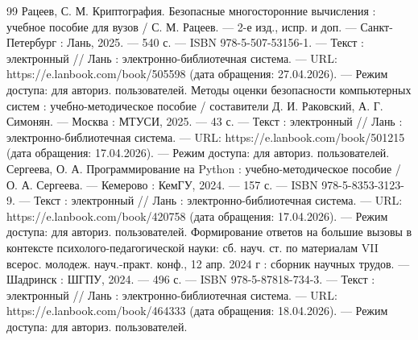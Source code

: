 \documentclass[14pt, a4paper]{extarticle}
\newcommand{\currentappendixletter}{А}
\newcommand{\setappendixletter}[1]{
  \renewcommand{\currentappendixletter}{#1}
}
\begin{document}
\begin{thebibliography}{99}
	Рацеев, С. М. Криптография. Безопасные многосторонние вычисления : учебное пособие для вузов / С. М. Рацеев. — 2-е изд., испр. и доп. — Санкт-Петербург : Лань, 2025. — 540 с. — ISBN 978-5-507-53156-1. — Текст : электронный // Лань : электронно-библиотечная система. — URL: https://e.lanbook.com/book/505598 (дата обращения: 27.04.2026). — Режим доступа: для авториз. пользователей.
	Методы оценки безопасности компьютерных систем : учебно-методическое пособие / составители Д. И. Раковский, А. Г. Симонян. — Москва : МТУСИ, 2025. — 43 с. — Текст : электронный // Лань : электронно-библиотечная система. — URL: https://e.lanbook.com/book/501215 (дата обращения: 17.04.2026). — Режим доступа: для авториз. пользователей.
	Сергеева, О. А. Программирование на Python : учебно-методическое пособие / О. А. Сергеева. — Кемерово : КемГУ, 2024. — 157 с. — ISBN 978-5-8353-3123-9. — Текст : электронный // Лань : электронно-библиотечная система. — URL: https://e.lanbook.com/book/420758 (дата обращения: 17.04.2026). — Режим доступа: для авториз. пользователей.
	Формирование ответов на большие вызовы в контексте психолого-педагогической науки: сб. науч. ст. по материалам VII всерос. молодеж. науч.-практ. конф., 12 апр. 2024 г : сборник научных трудов. — Шадринск : ШГПУ, 2024. — 496 с. — ISBN 978-5-87818-734-3. — Текст : электронный // Лань : электронно-библиотечная система. — URL: https://e.lanbook.com/book/464333 (дата обращения: 18.04.2026). — Режим доступа: для авториз. пользователей.
	\end{thebibliography}
		
	\label{bib:end}

	\afterpage{\setlength{\footskip}{3cm}}
	\afterpage{\setlength{\skip\footins}{\baselineskip}}

	\newpage

	\setappendixletter{А}
	
	\newpage
	\setappendixletter{Б}
	
\end{document}
